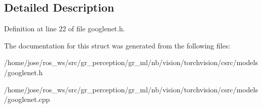 \subsection{Detailed Description}


Definition at line 22 of file googlenet.\+h.



The documentation for this struct was generated from the following files\+:\begin{DoxyCompactItemize}
\item 
/home/jose/ros\+\_\+ws/src/gr\+\_\+perception/gr\+\_\+ml/nb/vision/torchvision/csrc/models/googlenet.\+h\item 
/home/jose/ros\+\_\+ws/src/gr\+\_\+perception/gr\+\_\+ml/nb/vision/torchvision/csrc/models/googlenet.\+cpp\end{DoxyCompactItemize}
